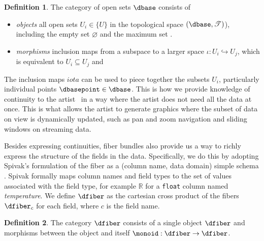 \documentclass[10pt,journal,compsoc]{IEEEtran}
\theoremstyle{definition}
\newtheorem{definition}{Definition}[section]
\theoremstyle{remark}
\begin{document}
\begin{definition} The category of open sets $\mathcal{\dbase}$ consists of
  \label{def:category:K} 
  \begin{itemize}
    \item \textit{objects} all open sets $U_{i} \in \{U\}$ in the topological space\cite{bradleyTopologyCategoricalApproach2020, } $(\dbase, \mathscr{T})$), including the empty set $\varnothing$ and the maximum set \dbase. 
    \item \textit{morphisms} inclusion maps from a subspace to a larger space $\iota: U_{i} \hookrightarrow U_{j}$, which is equivalent to $U_{i} \subseteq U_{j}$ and  
  \end{itemize} 
\end{definition}

The inclusion maps $iota$ can be used to piece together the subsets $U_{i}$, particularly individual points $\dbasepoint \in \dbase$. This is how we provide knowledge of continuity to the artist \vartist\ in a way where the artist does not need all the data at once. This is what allows the artist to generate graphics where the subset of data on view is dynamically updated, such as pan and zoom navigation\cite{NekrasovskiEvaluationPanZoom2006} and sliding windows on streaming data\cite{crouchDynamicGraphsSlidingwindow2013,chuTimeSeriesSegmentation1995}.

Besides expressing continuities, fiber bundles also provide us a way to richly express the structure of the fields in the data. Specifically, we do this by adopting Spivak's formulation of the fiber as a (column name, data domain) simple schema \cite{spivakSIMPLICIALDATABASES,spivakDatabasesAreCategories2010}. Spivak formally maps column names and field types to the set of values associated with the field type, for example $\mathbb{R}$ for a \texttt{float} column named \textit{temperature}. We define $\dfiber$ as  the cartesian cross product of the fibers $\dfiber_c$ for each field, where $c$ is the field name.  

\begin{definition} 
  \label{def:category:F} 
  The category $\mathcal{\dfiber}$ consists of a single object $\dfiber$ and morphisms between the object and itself $\monoid: \dfiber \rightarrow \dfiber$. 
\end{definition}
\end{document}
